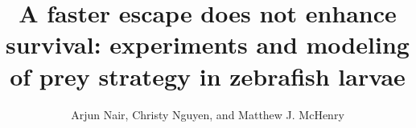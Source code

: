 \documentclass[]{rsos}%
\begin{document}
\title{A faster escape does not enhance survival: experiments and modeling of prey strategy in zebrafish larvae}


\author{%
Arjun Nair, Christy Nguyen, and Matthew J. McHenry}

\address{Department of Ecology and Evolutionary Biology\\
University of California, Irvine\\
321 Steinhaus Hall\\
Irvine, CA 92697}

\subject{Animal behavior, biomechanics}






\maketitle




\linespread{1.6}\selectfont %
\end{document}

